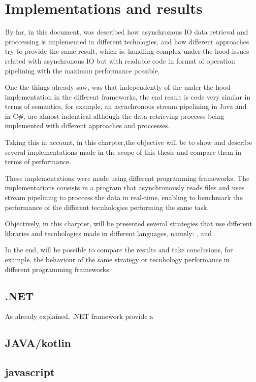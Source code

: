 \chapter{ Implementations and results }
\label{cha:a_short_latex_tutorial_with_examples}

By far, in this document, was described how asynchronous IO data retrieval and proccessing is implemented in different techologies, and how different approaches try to provide the same result, which is: handling complex under the hood issues related with asynchronous IO but with readable code in format of operation pipelining with the maximun performance possible. 

One the things already saw, was that independently of the under the hood implementation in the different frameworks, the end result is code very similar in terms of semantics, for example, an asynchronous stream pipelining in Java and in C\#, are almost indentical although the data retrieving proccess being implemented with different approaches and proccesses. 

Taking this in account, in this charpter,the objective will be to show and describe several implementations made in the scope of this thesis and compare them in terms of performance. 

These implementations were made using different programming frameworks. The implementations consists in a program that asynchronously reads files and uses stream pipelining to proccess the data in real-time, enabling to benchmark the performance of the different tecnhologies performing the same task.

Objectively, in this charpter, will be presented several strategies that use different libraries and tecnhologies made in different languages, namely: ,  and .

In the end, will be possible to compare the results and take conclusions, for example, the behaviour of the same strategy or tecnhology performance in different programming frameworks.


\section{.NET} %
\label{sec:dotnet_implementation}
As already explained, .NET framework provide a 


\section{JAVA/kotlin} %
\label{sec:java_implementation}

\section{javascript} %
\label{sec:js_implementation}

